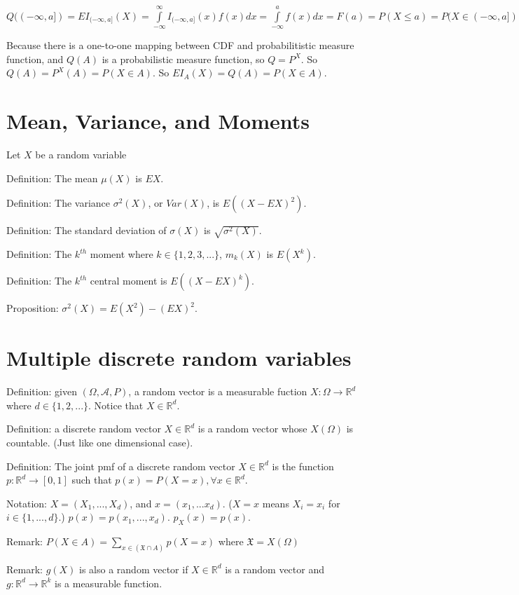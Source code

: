 \documentclass[12pt]{article}
\newcommand{\A}{\mathcal{A}}
\begin{document}
$Q((-\infty,a])=EI_{(-\infty,a]}(X)=\int\limits_{-\infty}^{\infty}I_{(-\infty,a]}(x)f(x)dx
=\int\limits_{-\infty}^{a}f(x)dx=F(a)=P(X\le a)=P(X\in(-\infty,a])=P^{X}((-\infty,a])$

Because there is a one-to-one mapping between CDF and probabilitistic measure function,
and $Q(A)$ is a probabilistic measure function,
so $Q=P^X$. So $Q(A)=P^X(A)=P(X\in A)$. So $EI_A(X)=Q(A)=P(X\in A)$.

\section{Mean, Variance, and Moments}

Let $X$ be a random variable

Definition: The mean $\mu(X)$ is $EX$.

Definition: The variance $\sigma^2(X)$, or $Var(X)$, is $E((X-EX)^2)$.

Definition: The standard deviation of $\sigma(X)$ is $\sqrt{\sigma^2(X)}$.

Definition: The $k^{th}$ moment where $k\in \{1,2,3,...\}$,
$m_k(X)$ is $E(X^k)$.

Definition: The $k^{th}$ central moment is $E((X-EX)^k)$.

Proposition: $\sigma^2(X)=E(X^2)-(EX)^2$.

\section{Multiple discrete random variables}

Definition: given $(\Omega,\A, P)$,
a random vector is a measurable fuction $X:\Omega\rightarrow \mathbb{R}^d$ where $d\in\{1,2,...\}$.
Notice that $X\in\mathbb{R}^d$.

Definition: a discrete random vector $X\in \mathbb{R}^d$ is a random vector
whose $X(\Omega)$ is countable. (Just like one dimensional case).

Definition: The joint pmf of a discrete random vector $X\in\mathbb{R}^d$
is the function $p:\mathbb{R}^d\rightarrow[0,1]$ such that 
$p(x)=P(X=x),\forall x\in\mathbb{R}^d$.

Notation: $X=(X_1,...,X_d)$, and $x=(x_1,...x_d)$.
($X=x$ means $X_i=x_i$ for $i\in\{1,...,d\}$.)
$p(x)=p(x_1,...,x_d)$.
$p_X(x)=p(x)$.

Remark: $P(X\in A)=\sum\limits_{x\in(\mathfrak{X}\cap A)} p(X=x)$ where $\mathfrak{X}=X(\Omega)$

Remark: $g(X)$ is also a random vector if $X\in\mathbb{R}^d$ is a random vector
and $g:\mathbb{R}^d\rightarrow\mathbb{R}^k$ is a measurable function.
\end{document}
